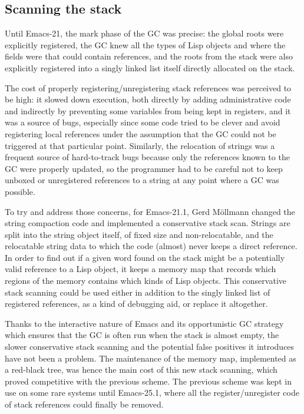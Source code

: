\documentclass[format=acmsmall, review]{acmart}
\begin{document}


\subsection{Scanning the stack}
\label{sec:stack-scanning}

Until Emacs-21, the mark phase of the GC was precise: the global roots were
explicitly registered, the GC knew all the types of Lisp objects and where
the fields were that could contain references, and the roots from the stack
were also explicitly registered into a singly linked list itself directly
allocated on the stack.

The cost of properly registering/unregistering stack references was
perceived to be high: it slowed down execution, both directly by adding
administrative code and indirectly by preventing some variables from being
kept in registers, and it was a source of bugs, especially since some code
tried to be clever and avoid registering local references under the
assumption that the GC could not be triggered at that particular point.
Similarly, the relocation of strings was a frequent source of hard-to-track
bugs because only the references known to the GC were properly updated, so
the programmer had to be careful not to keep unboxed or unregistered
references to a string at any point where a GC was possible.

To try and address those concerns, for Emacs-21.1, Gerd Möllmann changed the
string compaction code and implemented a conservative stack scan.
Strings are split into the string object itself, of fixed size and
non-relocatable, and the relocatable string data to which the code (almost)
never keeps a direct reference.  In order to find out if a given word found
on the stack might be a potentially valid reference to a Lisp object, it
keeps a memory map that records which regions of the memory contains which
kinds of Lisp objects.  This conservative stack scanning could be used
either in addition to the singly linked list of registered references, as
a kind of debugging aid, or replace it altogether.

Thanks to the interactive nature of Emacs and its opportunistic GC strategy
which ensures that the GC is often run when the stack is almost empty, the
slower conservative stack scanning and the potential false positives it
introduces have not been a problem.  The maintenance of the memory map,
implemented as a red-black tree, was hence the main cost of this new stack
scanning, which proved competitive with the previous scheme.  The previous
scheme was kept in use on some rare systems until Emacs-25.1, where all the
register/unregister code of stack references could finally be removed.
\end{document}
